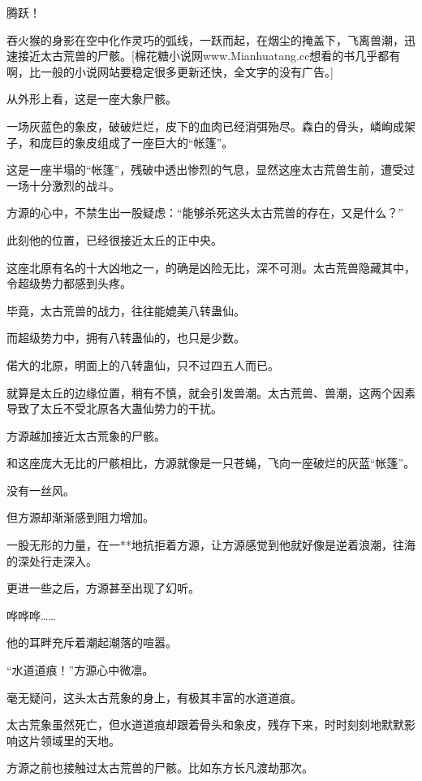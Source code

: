 
\begin{this_body}

腾跃！

吞火猴的身影在空中化作灵巧的弧线，一跃而起，在烟尘的掩盖下，飞离兽潮，迅速接近太古荒兽的尸骸。[棉花糖小说网www.Mianhuatang.cc想看的书几乎都有啊，比一般的小说网站要稳定很多更新还快，全文字的没有广告。]

从外形上看，这是一座大象尸骸。

一场灰蓝色的象皮，破破烂烂，皮下的血肉已经消弭殆尽。森白的骨头，嶙峋成架子，和庞巨的象皮组成了一座巨大的“帐篷”。

这是一座半塌的“帐篷”，残破中透出惨烈的气息，显然这座太古荒兽生前，遭受过一场十分激烈的战斗。

方源的心中，不禁生出一股疑虑：“能够杀死这头太古荒兽的存在，又是什么？”

此刻他的位置，已经很接近太丘的正中央。

这座北原有名的十大凶地之一，的确是凶险无比，深不可测。太古荒兽隐藏其中，令超级势力都感到头疼。

毕竟，太古荒兽的战力，往往能媲美八转蛊仙。

而超级势力中，拥有八转蛊仙的，也只是少数。

偌大的北原，明面上的八转蛊仙，只不过四五人而已。

就算是太丘的边缘位置，稍有不慎，就会引发兽潮。太古荒兽、兽潮，这两个因素导致了太丘不受北原各大蛊仙势力的干扰。

方源越加接近太古荒象的尸骸。

和这座庞大无比的尸骸相比，方源就像是一只苍蝇，飞向一座破烂的灰蓝“帐篷”。

没有一丝风。

但方源却渐渐感到阻力增加。

一股无形的力量，在一**地抗拒着方源，让方源感觉到他就好像是逆着浪潮，往海的深处行走深入。

更进一些之后，方源甚至出现了幻听。

哗哗哗……

他的耳畔充斥着潮起潮落的喧嚣。

“水道道痕！”方源心中微凛。

毫无疑问，这头太古荒象的身上，有极其丰富的水道道痕。

太古荒象虽然死亡，但水道道痕却跟着骨头和象皮，残存下来，时时刻刻地默默影响这片领域里的天地。

方源之前也接触过太古荒兽的尸骸。比如东方长凡渡劫那次。


\end{this_body}
